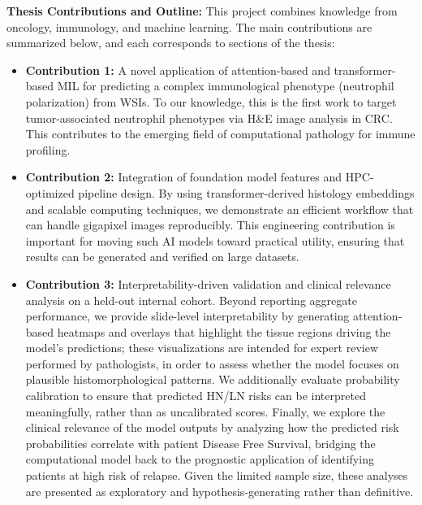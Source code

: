 \textbf{Thesis Contributions and Outline:} This project combines knowledge from oncology, immunology, and machine learning. The main contributions are summarized below, and each corresponds to sections of the thesis:
\begin{itemize}
    \item \textbf{Contribution 1:} A novel application of attention-based and transformer-based MIL for predicting a complex immunological phenotype (neutrophil polarization) from WSIs. To our knowledge, this is the first work to target tumor-associated neutrophil phenotypes via H\&E image analysis in CRC. This contributes to the emerging field of computational pathology for immune profiling.
    \item \textbf{Contribution 2:} Integration of foundation model features and HPC-optimized pipeline design. By using transformer-derived histology embeddings and scalable computing techniques, we demonstrate an efficient workflow that can handle gigapixel images reproducibly. This engineering contribution is important for moving such AI models toward practical utility, ensuring that results can be generated and verified on large datasets.
    \item \textbf{Contribution 3:} Interpretability-driven validation and clinical relevance analysis on a held-out internal cohort. 
    Beyond reporting aggregate performance, we provide slide-level interpretability by generating attention-based heatmaps and overlays that highlight the tissue regions driving the model’s predictions; these visualizations are intended for expert review performed by pathologists, in order to assess whether the model focuses on plausible histomorphological patterns. 
    We additionally evaluate probability calibration to ensure that predicted HN/LN risks can be interpreted meaningfully, rather than as uncalibrated scores. 
    Finally, we explore the clinical relevance of the model outputs by analyzing how the predicted risk probabilities correlate with patient Disease Free Survival, bridging the computational model back to the prognostic application of identifying patients at high risk of relapse. 
    Given the limited sample size, these analyses are presented as exploratory and hypothesis-generating rather than definitive.

\end{itemize}

